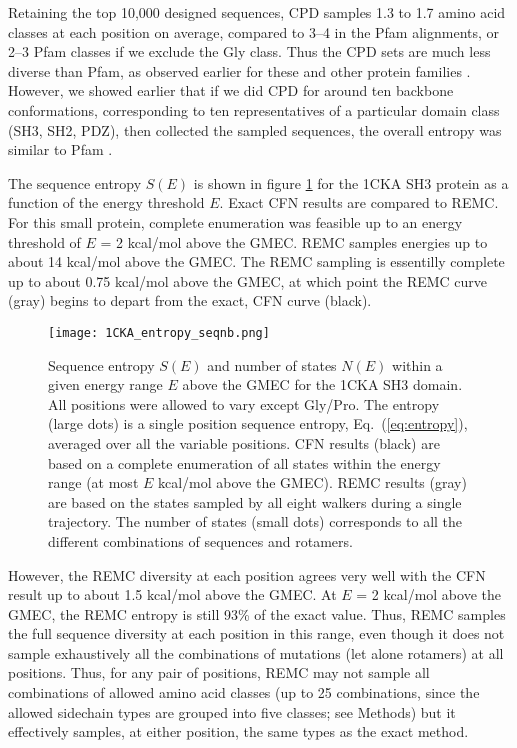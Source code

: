 Retaining the top 10,000 designed sequences, CPD samples 1.3 to 1.7 amino acid classes at each position on average, compared to 3--4 in the Pfam alignments, or 2--3 Pfam classes if we exclude the Gly class. Thus the CPD sets are much less diverse than Pfam, as observed earlier for these and other protein families \cite{Schmidt09,Schmidt10}. However, we showed earlier that if we did CPD for around ten backbone conformations, corresponding to ten representatives of a particular domain class (SH3, SH2, PDZ), then collected the sampled sequences, the overall entropy was similar to Pfam \cite{Schmidt09,Schmidt10}. 

The sequence entropy $S(E)$ is shown in figure \ref{fig:entropy} for the 1CKA SH3 protein as a function of the energy threshold $E$. Exact CFN results are compared to REMC. For this small protein, complete enumeration was feasible up to an energy threshold of $E$ = 2 kcal/mol above the GMEC. REMC samples energies up to about 14 kcal/mol above the GMEC. The REMC sampling is essentilly complete up to about 0.75 kcal/mol above the GMEC, at which point the REMC curve (gray) begins to depart from the exact, CFN curve (black).


    \begin{figure}[!htbp]
      \centering
        \texttt{[image: 1CKA\_entropy\_seqnb.png]} 
\caption{ 
Sequence entropy $S(E)$ and number of states $N(E)$ within a given energy range $E$ above the GMEC for the 1CKA SH3 domain. All positions were allowed to vary except Gly/Pro. The entropy (large dots) is a single position sequence entropy, Eq.\ (\ref{eq:entropy}), averaged over all the variable positions. CFN results (black) are based on a complete enumeration of all states within the energy range (at most $E$ kcal/mol above the GMEC). REMC results (gray) are based on the states sampled by all eight walkers during a single trajectory. The number of states (small dots) corresponds to all the different combinations of sequences and rotamers.
}
       \label{fig:entropy}
    \end{figure}

However, the REMC diversity at each position agrees very well with the CFN result up to about 1.5 kcal/mol above the GMEC. At $E$ = 2 kcal/mol above the GMEC, the REMC entropy is still 93\% of the exact value.
Thus, REMC samples the full sequence diversity at each position in this range, even though it does not sample exhaustively all the combinations of mutations (let alone rotamers) at all positions. Thus, for any pair of positions, REMC may not sample all combinations of allowed amino acid classes (up to 25 combinations, since the allowed sidechain types are grouped into five classes; see Methods) but it effectively samples, at either position, the same types as the exact method.

